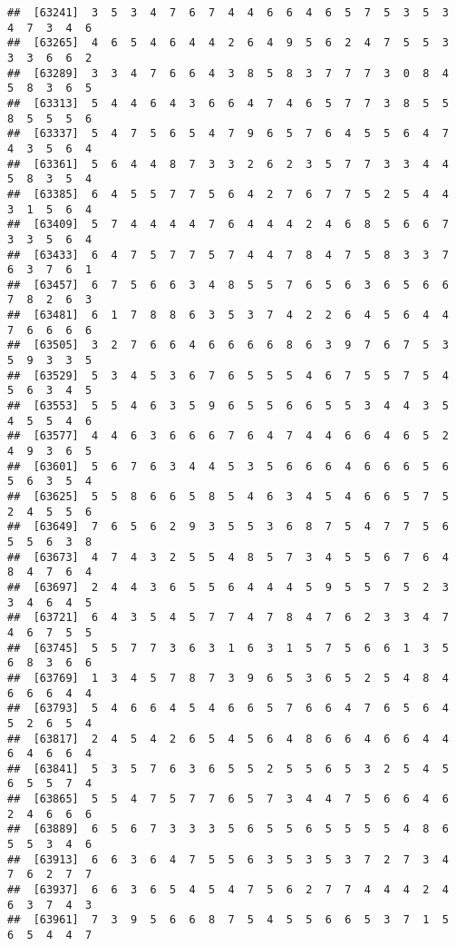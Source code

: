\documentclass[
]{book}
\begin{document}
\begin{verbatim}
##  [63241]  3  5  3  4  7  6  7  4  4  6  6  4  6  5  7  5  3  5  3  4  7  3  4  6
##  [63265]  4  6  5  4  6  4  4  2  6  4  9  5  6  2  4  7  5  5  3  3  3  6  6  2
##  [63289]  3  3  4  7  6  6  4  3  8  5  8  3  7  7  7  3  0  8  4  5  8  3  6  5
##  [63313]  5  4  4  6  4  3  6  6  4  7  4  6  5  7  7  3  8  5  5  8  5  5  5  6
##  [63337]  5  4  7  5  6  5  4  7  9  6  5  7  6  4  5  5  6  4  7  4  3  5  6  4
##  [63361]  5  6  4  4  8  7  3  3  2  6  2  3  5  7  7  3  3  4  4  5  8  3  5  4
##  [63385]  6  4  5  5  7  7  5  6  4  2  7  6  7  7  5  2  5  4  4  3  1  5  6  4
##  [63409]  5  7  4  4  4  4  7  6  4  4  4  2  4  6  8  5  6  6  7  3  3  5  6  4
##  [63433]  6  4  7  5  7  7  5  7  4  4  7  8  4  7  5  8  3  3  7  6  3  7  6  1
##  [63457]  6  7  5  6  6  3  4  8  5  5  7  6  5  6  3  6  5  6  6  7  8  2  6  3
##  [63481]  6  1  7  8  8  6  3  5  3  7  4  2  2  6  4  5  6  4  4  7  6  6  6  6
##  [63505]  3  2  7  6  6  4  6  6  6  6  8  6  3  9  7  6  7  5  3  5  9  3  3  5
##  [63529]  5  3  4  5  3  6  7  6  5  5  5  4  6  7  5  5  7  5  4  5  6  3  4  5
##  [63553]  5  5  4  6  3  5  9  6  5  5  6  6  5  5  3  4  4  3  5  4  5  5  4  6
##  [63577]  4  4  6  3  6  6  6  7  6  4  7  4  4  6  6  4  6  5  2  4  9  3  6  5
##  [63601]  5  6  7  6  3  4  4  5  3  5  6  6  6  4  6  6  6  5  6  5  6  3  5  4
##  [63625]  5  5  8  6  6  5  8  5  4  6  3  4  5  4  6  6  5  7  5  2  4  5  5  6
##  [63649]  7  6  5  6  2  9  3  5  5  3  6  8  7  5  4  7  7  5  6  5  5  6  3  8
##  [63673]  4  7  4  3  2  5  5  4  8  5  7  3  4  5  5  6  7  6  4  8  4  7  6  4
##  [63697]  2  4  4  3  6  5  5  6  4  4  4  5  9  5  5  7  5  2  3  3  4  6  4  5
##  [63721]  6  4  3  5  4  5  7  7  4  7  8  4  7  6  2  3  3  4  7  4  6  7  5  5
##  [63745]  5  5  7  7  3  6  3  1  6  3  1  5  7  5  6  6  1  3  5  6  8  3  6  6
##  [63769]  1  3  4  5  7  8  7  3  9  6  5  3  6  5  2  5  4  8  4  6  6  6  4  4
##  [63793]  5  4  6  6  4  5  4  6  6  5  7  6  6  4  7  6  5  6  4  5  2  6  5  4
##  [63817]  2  4  5  4  2  6  5  4  5  6  4  8  6  6  4  6  6  4  4  6  4  6  6  4
##  [63841]  5  3  5  7  6  3  6  5  5  2  5  5  6  5  3  2  5  4  5  6  5  5  7  4
##  [63865]  5  5  4  7  5  7  7  6  5  7  3  4  4  7  5  6  6  4  6  2  4  6  6  6
##  [63889]  6  5  6  7  3  3  3  5  6  5  5  6  5  5  5  5  4  8  6  5  5  3  4  6
##  [63913]  6  6  3  6  4  7  5  5  6  3  5  3  5  3  7  2  7  3  4  7  6  2  7  7
##  [63937]  6  6  3  6  5  4  5  4  7  5  6  2  7  7  4  4  4  2  4  6  3  7  4  3
##  [63961]  7  3  9  5  6  6  8  7  5  4  5  5  6  6  5  3  7  1  5  6  5  4  4  7

\end{verbatim}
\end{document}
